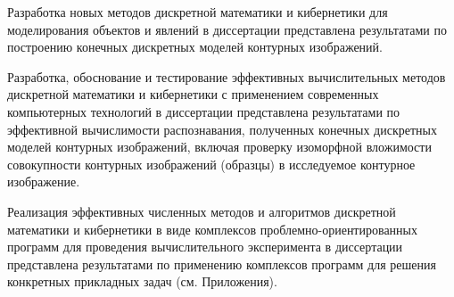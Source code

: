 Разработка новых  методов дискретной математики и  кибернетики для моделирования объектов и явлений  в диссертации представлена результатами по построению конечных дискретных моделей контурных изображений.

Разработка, обоснование и тестирование эффективных вычислительных методов дискретной математики и  кибернетики с применением современных компьютерных технологий в диссертации представлена результатами по эффективной вычислимости распознавания, полученных конечных дискретных  моделей контурных изображений, включая проверку изоморфной вложимости совокупности контурных изображений (образцы) в исследуемое контурное изображение.

Реализация эффективных численных методов и алгоритмов дискретной математики и  кибернетики в виде комплексов проблемно-ориентированных программ для проведения вычислительного эксперимента в диссертации представлена результатами по применению комплексов программ для решения конкретных прикладных задач  (см. Приложения).

